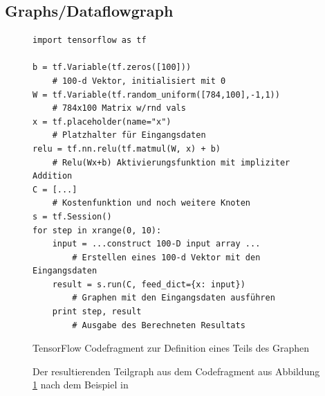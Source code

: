 \subsection{Graphs/Dataflowgraph}

\begin{figure}

\lstset{language=Python}
\begin{lstlisting}
import tensorflow as tf

b = tf.Variable(tf.zeros([100])) 
	# 100-d Vektor, initialisiert mit 0
W = tf.Variable(tf.random_uniform([784,100],-1,1)) 
	# 784x100 Matrix w/rnd vals
x = tf.placeholder(name="x") 
	# Platzhalter für Eingangsdaten
relu = tf.nn.relu(tf.matmul(W, x) + b) 
	# Relu(Wx+b) Aktivierungsfunktion mit impliziter Addition
C = [...] 
	# Kostenfunktion und noch weitere Knoten
s = tf.Session()
for step in xrange(0, 10):
	input = ...construct 100-D input array ... 
		# Erstellen eines 100-d Vektor mit den Eingangsdaten
	result = s.run(C, feed_dict={x: input}) 
		# Graphen mit den Eingangsdaten ausführen
	print step, result 
		# Ausgabe des Berechneten Resultats
\end{lstlisting}

	\caption{TensorFlow Codefragment zur Definition eines Teils des Graphen}
	\label{fig:SimpleFragmentGraphDefinition}
\end{figure}

\begin{figure}

	\centering


	\caption{Der resultierenden Teilgraph aus dem Codefragment aus Abbildung \ref{fig:SimpleFragmentGraphDefinition} nach dem Beispiel in \cite{wp2015tensorflow}}
	\label{fig:SimpleFragmentGraphPic}
\end{figure}


